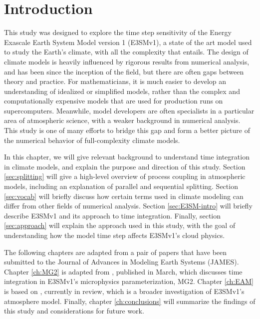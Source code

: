\documentclass [11pt, proquest] {uwthesis}[2020/02/24]
\begin{document}
 
 
%
%

\textpages
 
 
\chapter{Introduction}

This study was designed to explore the time step sensitivity of the Energy Exascale Earth System Model version 1 (E3SMv1), a state of the art model used to study the Earth's climate, with all the complexity that entails. The design of climate models is heavily influenced by rigorous results from numerical analysis, and has been since the inception of the field, but there are often gaps between theory and practice. For mathematicians, it is much easier to develop an understanding of idealized or simplified models, rather than the complex and computationally expensive models that are used for production runs on supercomputers. Meanwhile, model developers are often specialists in a particular area of atmospheric science, with a weaker background in numerical analysis. This study is one of many efforts to bridge this gap and form a better picture of the numerical behavior of full-complexity climate models.

In this chapter, we will give relevant background to understand time integration in climate models, and explain the purpose and direction of this study. Section \ref{sec:splitting} will give a high-level overview of process coupling in atmospheric models, including an explanation of parallel and sequential splitting. Section \ref{sec:vocab} will briefly discuss how certain terms used in climate modeling can differ from other fields of numerical analysis. Section \ref{sec:E3SM-intro} will briefly describe E3SMv1 and its approach to time integration. Finally, section \ref{sec:approach} will explain the approach used in this study, with the goal of understanding how the model time step affects E3SMv1's cloud physics.

The following chapters are adapted from a pair of papers that have been submitted to the Journal of Advances in Modeling Earth Systems (JAMES). Chapter \ref{ch:MG2} is adapted from  \textcite{Santos2020}, published in March, which discusses time integration in E3SMv1's microphysics parameterization, MG2. Chapter \ref{ch:EAM} is based on \textcite{Santos2020b}, currently in review, which is a broader investigation of E3SMv1's atmosphere model. Finally, chapter \ref{ch:conclusions} will summarize the findings of this study and considerations for future work.
\end{document}

